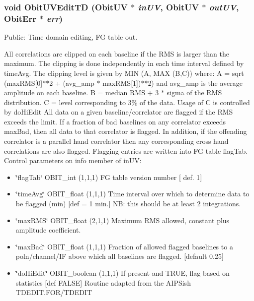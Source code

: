 \subsubsection{\setlength{\rightskip}{0pt plus 5cm}void Obit\-UVEdit\-TD ({\bf Obit\-UV} $\ast$ {\em in\-UV}, {\bf Obit\-UV} $\ast$ {\em out\-UV}, {\bf Obit\-Err} $\ast$ {\em err})}\label{ObitUVEdit_8c_a22}


Public: Time domain editing, FG table out. 

All correlations are clipped on each baseline if the RMS is larger than the maximum. The clipping is done independently in each time interval defined by time\-Avg. The clipping level is given by MIN (A, MAX (B,C)) where: A = sqrt (max\-RMS[0]$\ast$$\ast$2 + (avg\_\-amp $\ast$ max\-RMS[1])$\ast$$\ast$2) and avg\_\-amp is the average amplitude on each baseline. B = median RMS + 3 $\ast$ sigma of the RMS distribution. C = level corresponding to 3\% of the data. Usage of C is controlled by do\-Hi\-Edit All data on a given baseline/correlator are flagged if the RMS exceeds the limit. If a fraction of bad baselines on any correlator exceeds max\-Bad, then all data to that correlator is flagged. In addition, if the offending correlator is a parallel hand correlator then any corresponding cross hand correlations are also flagged. Flagging entries are written into FG table flag\-Tab. Control parameters on info member of in\-UV: \begin{itemize}
\item \char`\"{}flag\-Tab\char`\"{} OBIT\_\-int (1,1,1) FG table version number [ def. 1] \item \char`\"{}time\-Avg\char`\"{} OBIT\_\-float (1,1,1) Time interval over which to determine data to be flagged (min) [def = 1 min.] NB: this should be at least 2 integrations. \item \char`\"{}max\-RMS\char`\"{} OBIT\_\-float (2,1,1) Maximum RMS allowed, constant plus amplitude coefficient. \item \char`\"{}max\-Bad\char`\"{} OBIT\_\-float (1,1,1) Fraction of allowed flagged baselines to a poln/channel/IF above which all baselines are flagged. [default 0.25] \item \char`\"{}do\-Hi\-Edit\char`\"{} OBIT\_\-boolean (1,1,1) If present and TRUE, flag based on statistics [def FALSE] Routine adapted from the AIPSish TDEDIT.FOR/TDEDIT 
\end{itemize}
